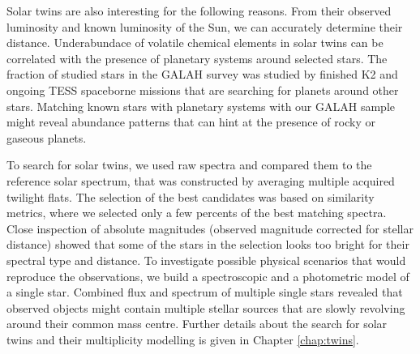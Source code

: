 Solar twins are also interesting for the following reasons. From their observed luminosity and known luminosity of the Sun, we can accurately determine their distance. Underabundace of volatile chemical elements in solar twins can be correlated with the presence of planetary systems around selected stars. The fraction of studied stars in the GALAH survey was studied by finished K2 \cite{2014PASP..126..398H} and ongoing TESS \cite{2014SPIE.9143E..20R} spaceborne missions that are searching for planets around other stars. Matching known stars with planetary systems with our GALAH sample might reveal abundance patterns that can hint at the presence of rocky or gaseous planets.

To search for solar twins, we used raw spectra and compared them to the reference solar spectrum, that was constructed by averaging multiple acquired twilight flats. The selection of the best candidates was based on similarity metrics, where we selected only a few percents of the best matching spectra. Close inspection of absolute magnitudes (observed magnitude corrected for stellar distance) showed that some of the stars in the selection looks too bright for their spectral type and distance. To investigate possible physical scenarios that would reproduce the observations, we build a spectroscopic and a photometric model of a single star. Combined flux and spectrum of multiple single stars revealed that observed objects might contain multiple stellar sources that are slowly revolving around their common mass centre. Further details about the search for solar twins and their multiplicity modelling is given in Chapter \ref{chap:twins}.